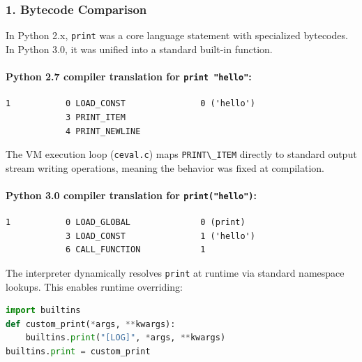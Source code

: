 \hypertarget{bytecode-comparison}{%
\subsubsection{1. Bytecode Comparison}\label{bytecode-comparison}}

In Python 2.x, \passthrough{\lstinline!print!} was a core language
statement with specialized bytecodes. In Python 3.0, it was unified into
a standard built-in function.

\hypertarget{python-2.7-compiler-translation-for-print-hello}{%
\paragraph{\texorpdfstring{Python 2.7 compiler translation for
\texttt{print\ "hello"}:}{Python 2.7 compiler translation for print "hello":}}\label{python-2.7-compiler-translation-for-print-hello}}

\begin{lstlisting}
1           0 LOAD_CONST               0 ('hello')
            3 PRINT_ITEM
            4 PRINT_NEWLINE
\end{lstlisting}

The VM execution loop (\passthrough{\lstinline!ceval.c!}) maps
\passthrough{\lstinline!PRINT\_ITEM!} directly to standard output stream
writing operations, meaning the behavior was fixed at compilation.

\hypertarget{python-3.0-compiler-translation-for-printhello}{%
\paragraph{\texorpdfstring{Python 3.0 compiler translation for
\texttt{print("hello")}:}{Python 3.0 compiler translation for print("hello"):}}\label{python-3.0-compiler-translation-for-printhello}}

\begin{lstlisting}
1           0 LOAD_GLOBAL              0 (print)
            3 LOAD_CONST               1 ('hello')
            6 CALL_FUNCTION            1
\end{lstlisting}

The interpreter dynamically resolves \passthrough{\lstinline!print!} at
runtime via standard namespace lookups. This enables runtime overriding:

\begin{lstlisting}[language=Python]
import builtins
def custom_print(*args, **kwargs):
    builtins.print("[LOG]", *args, **kwargs)
builtins.print = custom_print
\end{lstlisting}

